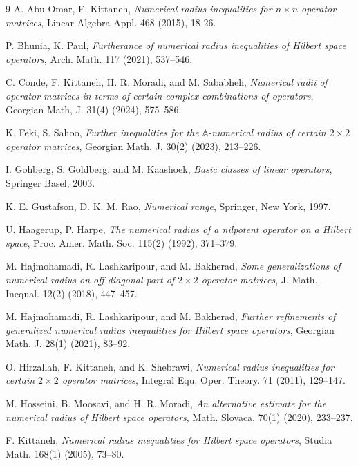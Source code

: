 \documentclass[12pt,twoside,reqno]{amsart}
\numberwithin{equation}{section}
\begin{document}
\begin{thebibliography}{9}
A. Abu-Omar, F. Kittaneh, {\it Numerical radius inequalities for $n\times n$ operator matrices}, Linear Algebra Appl. 468 (2015), 18-26.

P. Bhunia, K. Paul, {\it Furtherance of numerical radius inequalities of Hilbert space operators}, Arch. Math. 117 (2021), 537--546.

C. Conde, F. Kittaneh,  H. R. Moradi, and M. Sababheh, {\it Numerical radii of operator matrices in terms of certain complex combinations of operators}, Georgian Math, J. {31}(4) (2024), 575--586.

K. Feki, S. Sahoo, {\it Further inequalities for the $\mathbb{A}$-numerical radius of certain $2\times 2$ operator matrices}, Georgian Math. J. {30}(2) (2023), 213--226.

I. Gohberg, S. Goldberg, and M. Kaashoek, {\it Basic classes of linear operators}, Springer Basel, 2003.

K. E. Gustafson, D. K. M. Rao, {\it Numerical range}, Springer, New York, 1997.

U. Haagerup, P. Harpe, {\it The numerical radius of a nilpotent operator on a Hilbert space}, Proc. Amer. Math. Soc. 115(2) (1992), 371--379.

 M. Hajmohamadi, R. Lashkaripour, and M. Bakherad, {\it Some generalizations of numerical radius on off-diagonal part of $2\times 2$ operator matrices}, J. Math. Inequal. {12}(2) (2018), 447--457.


M. Hajmohamadi, R. Lashkaripour, and M. Bakherad, {\it Further refinements of generalized numerical radius inequalities for Hilbert space operators}, Georgian Math. J. {28}(1) (2021), 83--92.

O. Hirzallah, F. Kittaneh, and K. Shebrawi, {\it Numerical radius inequalities for certain $2 \times 2$ operator matrices}, Integral Equ. Oper. Theory. {71} (2011), 129--147. 

M. Hosseini, B. Moosavi, and H. R. Moradi, {\it An alternative estimate for the numerical radius of Hilbert space operators}, Math. Slovaca. {70}(1) (2020), 233--237.

F. Kittaneh, {\it Numerical radius inequalities for Hilbert space operators}, Studia Math. {168}(1) (2005), 73--80.


\end{thebibliography}
\end{document}
